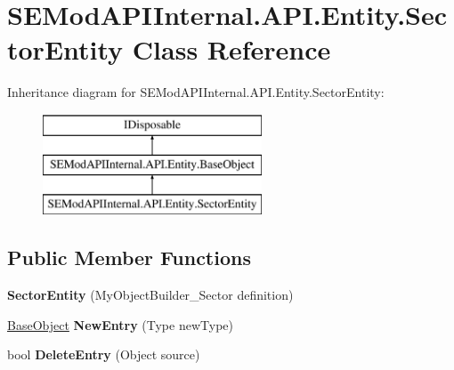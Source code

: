 \hypertarget{class_s_e_mod_a_p_i_internal_1_1_a_p_i_1_1_entity_1_1_sector_entity}{}\section{S\+E\+Mod\+A\+P\+I\+Internal.\+A\+P\+I.\+Entity.\+Sector\+Entity Class Reference}
\label{class_s_e_mod_a_p_i_internal_1_1_a_p_i_1_1_entity_1_1_sector_entity}
Inheritance diagram for S\+E\+Mod\+A\+P\+I\+Internal.\+A\+P\+I.\+Entity.\+Sector\+Entity\+:\begin{figure}[H]
\begin{center}
\leavevmode
\includegraphics[height=3.000000cm]{class_s_e_mod_a_p_i_internal_1_1_a_p_i_1_1_entity_1_1_sector_entity}
\end{center}
\end{figure}
\subsection*{Public Member Functions}
\begin{DoxyCompactItemize}
\item 
\hypertarget{class_s_e_mod_a_p_i_internal_1_1_a_p_i_1_1_entity_1_1_sector_entity_a9e0599418c91a53e65b223e461efe00a}{}{\bfseries Sector\+Entity} (My\+Object\+Builder\+\_\+\+Sector definition)\label{class_s_e_mod_a_p_i_internal_1_1_a_p_i_1_1_entity_1_1_sector_entity_a9e0599418c91a53e65b223e461efe00a}

\item 
\hypertarget{class_s_e_mod_a_p_i_internal_1_1_a_p_i_1_1_entity_1_1_sector_entity_a7f8753317fb708e4e1047beffbbe5b6c}{}\hyperlink{class_s_e_mod_a_p_i_internal_1_1_a_p_i_1_1_entity_1_1_base_object}{Base\+Object} {\bfseries New\+Entry} (Type new\+Type)\label{class_s_e_mod_a_p_i_internal_1_1_a_p_i_1_1_entity_1_1_sector_entity_a7f8753317fb708e4e1047beffbbe5b6c}

\item 
\hypertarget{class_s_e_mod_a_p_i_internal_1_1_a_p_i_1_1_entity_1_1_sector_entity_a0b686c11c46dcf1968d3495d85d9fa42}{}bool {\bfseries Delete\+Entry} (Object source)\label{class_s_e_mod_a_p_i_internal_1_1_a_p_i_1_1_entity_1_1_sector_entity_a0b686c11c46dcf1968d3495d85d9fa42}

\end{DoxyCompactItemize}
